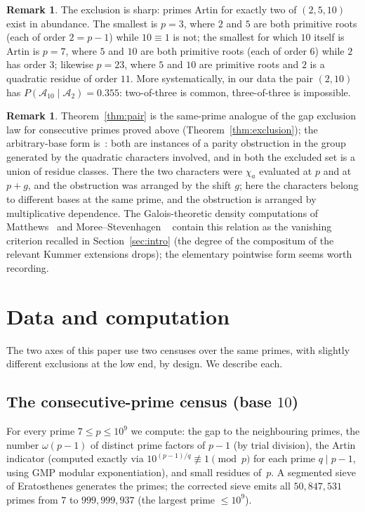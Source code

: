 \documentclass[11pt,reqno]{amsart}
\theoremstyle{plain}
\theoremstyle{definition}
\newtheorem{remark}[theorem]{Remark}
\newcommand{\Acal}{\mathcal{A}}
\begin{document}
\begin{remark}
The exclusion is sharp: primes Artin for exactly two of $(2,5,10)$ exist in
abundance. The smallest is $p = 3$, where $2$ and $5$ are both primitive roots
(each of order $2 = p-1$) while $10 \equiv 1$ is not; the smallest for which
$10$ itself is Artin is $p = 7$, where $5$ and $10$ are both primitive
roots (each of order $6$) while $2$ has order $3$; likewise $p = 23$, where
$5$ and $10$ are primitive roots and $2$ is a quadratic residue of order
$11$. More systematically, in our data the pair
$(2, 10)$ has $P(\Acal_{10} \mid \Acal_2) = 0.355$: two-of-three is common,
three-of-three is impossible.
\end{remark}

\begin{remark}
Theorem~\ref{thm:pair} is the same-prime analogue of the gap exclusion law
for consecutive primes proved above (Theorem~\ref{thm:exclusion}); the arbitrary-base form is~\cite{BaldII}: both are
instances of a parity obstruction in the group generated by the quadratic
characters involved, and in both the excluded set is a union of residue
classes. There the two characters were $\chi_a$ evaluated at $p$
and at $p + g$, and the obstruction was arranged by the shift $g$; here the
characters belong to different bases at the same prime, and the obstruction
is arranged by multiplicative dependence. The Galois-theoretic density
computations of Matthews~\cite{Matthews1976} and Moree--Stevenhagen%
~\cite{MoreeStevenhagen2014} contain this relation as the vanishing criterion
recalled in Section~\ref{sec:intro} (the degree of the compositum of the
relevant Kummer extensions drops); the elementary pointwise form seems worth
recording.
\end{remark}




\section{Data and computation}
\label{sec:data}

The two axes of this paper use two censuses over the same primes, with slightly different exclusions at the low end, by design. We describe each.

\subsection*{The consecutive-prime census (base $10$)}


For every prime $7 \le p \le 10^9$ we compute: the gap to the neighbouring
primes, the number $\omega(p-1)$ of distinct prime factors of $p - 1$ (by
trial division), the Artin indicator (computed exactly via
$10^{(p-1)/q} \not\equiv 1 \pmod p$ for each prime $q \mid p - 1$, using GMP
modular exponentiation), and small residues of~$p$. A segmented sieve of
Eratosthenes generates the primes; the corrected sieve emits all
$50{,}847{,}531$ primes from $7$ to $999{,}999{,}937$ (the largest prime
$\le 10^9$).
\end{document}
